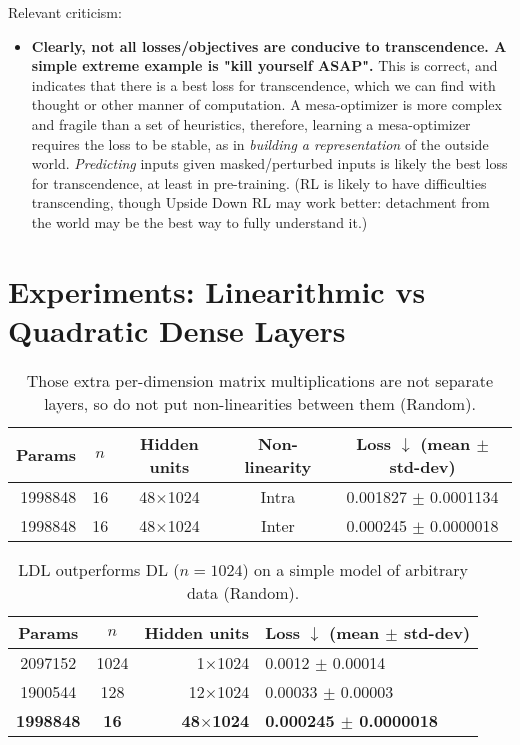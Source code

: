 \documentclass{article}
\begin{document}
Relevant criticism:

\begin{itemize}
\item \textbf{Clearly, not all losses/objectives are conducive to transcendence. A simple extreme example is "kill yourself ASAP".} This is correct, and indicates that there is a best loss for transcendence, which we can find with thought or other manner of computation. A mesa-optimizer is more complex and fragile than a set of heuristics, therefore, learning a mesa-optimizer requires the loss to be stable, as in \textit{building a representation} of the outside world. \textit{Predicting} inputs given masked/perturbed inputs is likely the best loss for transcendence, at least in pre-training. (RL is likely to have difficulties transcending, though Upside Down RL \cite{schmidhuber2020reinforcement} may work better: detachment from the world may be the best way to fully understand it.)
\end{itemize}

\section{Experiments: Linearithmic vs Quadratic Dense Layers}

\begin{table}
\begin{center}
\begin{tabular}{rcccc}
\hline
Params & $n$ & Hidden units & Non-linearity & Loss $\downarrow$ (mean $\pm$ std-dev) \\
\hline
1998848 & 16 & 48$\times$1024 & Intra & 0.001827 $\pm$ 0.0001134 \\
1998848 & 16 & 48$\times$1024 & Inter & 0.000245 $\pm$ 0.0000018 \\
\hline
\end{tabular}
\end{center}
\caption{Those extra per-dimension matrix multiplications are not separate layers, so do not put non-linearities between them (Random).}
\label{LDLintraVSinter}
\end{table}

\begin{table}
\begin{center}
\begin{tabular}{ccrl}
\hline
Params & $n$ & Hidden units & Loss $\downarrow$ (mean $\pm$ std-dev) \\
\hline
2097152 & 1024 & 1$\times$1024 & 0.0012 $\pm$ 0.00014 \\
1900544 & 128 & 12$\times$1024 & 0.00033 $\pm$ 0.00003 \\
\textbf{1998848} & \textbf{16} & \textbf{48$\times$1024} & \textbf{0.000245 $\pm$ 0.0000018} \\
\hline
\end{tabular}
\end{center}
\caption{LDL outperforms DL ($n=1024$) on a simple model of arbitrary data (Random).}
\label{randomLDLvsDL}
\end{table}
\end{document}
